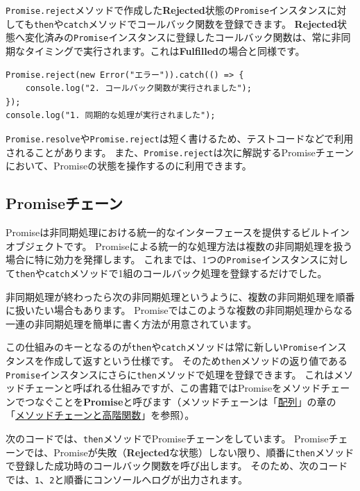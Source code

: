 \texttt{Promise.reject}メソッドで作成した\textbf{Rejected}状態の\texttt{Promise}インスタンスに対しても\texttt{then}や\texttt{catch}メソッドでコールバック関数を登録できます。
\textbf{Rejected}状態へ変化済みの\texttt{Promise}インスタンスに登録したコールバック関数は、常に非同期なタイミングで実行されます。これは\textbf{Fulfilled}の場合と同様です。

\begin{lstlisting}
Promise.reject(new Error("エラー")).catch(() => {
    console.log("2. コールバック関数が実行されました");
});
console.log("1. 同期的な処理が実行されました");
\end{lstlisting}

\texttt{Promise.resolve}や\texttt{Promise.reject}は短く書けるため、テストコードなどで利用されることがあります。
また、\texttt{Promise.reject}は次に解説するPromiseチェーンにおいて、Promiseの状態を操作するのに利用できます。

\hypertarget{promise-chain}{%
\subsection{Promiseチェーン}\label{promise-chain}}

Promiseは非同期処理における統一的なインターフェースを提供するビルトインオブジェクトです。
Promiseによる統一的な処理方法は複数の非同期処理を扱う場合に特に効力を発揮します。
これまでは、1つの\texttt{Promise}インスタンスに対して\texttt{then}や\texttt{catch}メソッドで1組のコールバック処理を登録するだけでした。

非同期処理が終わったら次の非同期処理というように、複数の非同期処理を順番に扱いたい場合もあります。
Promiseではこのような複数の非同期処理からなる一連の非同期処理を簡単に書く方法が用意されています。

この仕組みのキーとなるのが\texttt{then}や\texttt{catch}メソッドは常に新しい\texttt{Promise}インスタンスを作成して返すという仕様です。
そのため\texttt{then}メソッドの返り値である\texttt{Promise}インスタンスにさらに\texttt{then}メソッドで処理を登録できます。
これはメソッドチェーンと呼ばれる仕組みですが、この書籍ではPromiseをメソッドチェーンでつなぐことを\textbf{Promise}と呼びます（メソッドチェーンは「\hyperlink{array}{配列}」の章の「\hyperlink{method-chain-and-high-order-function}{メソッドチェーンと高階関数}」を参照）。

次のコードでは、\texttt{then}メソッドでPromiseチェーンをしています。
Promiseチェーンでは、Promiseが失敗（\textbf{Rejected}な状態）しない限り、順番に\texttt{then}メソッドで登録した成功時のコールバック関数を呼び出します。
そのため、次のコードでは、\texttt{1}、\texttt{2}と順番にコンソールへログが出力されます。

